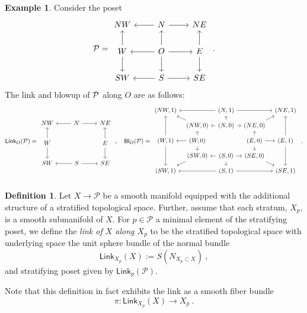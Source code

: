\documentclass{article}
\newcommand{\mc}[1]{\mathcal{#1}}
\newcommand{\msf}[1]{\mathsf{#1}}
\newcommand{\link}{\msf{Link}}
\newcommand{\bl}{\msf{Bl}}
\theoremstyle{definition}
\newtheorem{definition}[theorem]{Definition}
\newtheorem{example}[theorem]{Example}
\begin{document}
\begin{example}\label{planePoset}
    Consider the poset
    $$\cP = \begin{tikzcd}
            NW&N\arrow[r]\arrow[l]&NE\\
            W\arrow[u]\arrow[d]&O\arrow[u]\arrow[d]\arrow[r]\arrow[l]&E\arrow[u]\arrow[d]\\
            SW&S\arrow[r]\arrow[l]&SE
        \end{tikzcd}~.$$
    The link and blowup of $\mathcal P$ along $O$ are as follows:
    $$\link_O(\cP) = \begin{tikzcd}
            NW&N\arrow[r]\arrow[l]&NE\\
            W\arrow[u]\arrow[d]&&E\arrow[u]\arrow[d]\\
            SW&S\arrow[r]\arrow[l]&SE
        \end{tikzcd}~,\quad
            \bl_O(\cP) = \begin{tikzcd}[row sep= 0.7em,column sep = 0.7em]
            (NW,1)&&(N,1)\arrow[rr]\arrow[ll]&&(NE,1)\\
            &(NW,0)\arrow[ul]&(N,0)\arrow[r]\arrow[l]\arrow[u]&(NE,0)\arrow[ur]\\
            (W,1)\arrow[uu]\arrow[dd]&(W,0)\arrow[l]\arrow[u]\arrow[d]&&(E,0)\arrow[r]\arrow[u]\arrow[d]&(E,1)\arrow[uu]\arrow[dd]\\
            &(SW,0)\arrow[dl]&(S,0)\arrow[r]\arrow[l]\arrow[d]&(SE,0)\arrow[dr]\\
            (SW,1)&&(S,1)\arrow[rr]\arrow[ll]&&(SE,1)\\
        \end{tikzcd}~.$$
\end{example}

\begin{definition}
    Let $X \to \mc{P}$ be a smooth manifold equipped with the additional structure of a stratified topological
    space. Further, assume that each stratum, $X_p$, is a smooth submanifold of $X$. For $p \in \mc{P}$ a minimal element of the stratifying poset, we define the \emph{link of $X$ along $X_p$} to be the 
    stratified topological space with underlying space the unit sphere bundle of the normal bundle
    $$\link_{X_p}(X) := S(N_{X_p \subset X})~,$$
    and stratifying poset given by $\link_p(\mc{P})$. 
\end{definition}

Note that this definition in fact exhibits the link as a smooth fiber bundle
$$\pi:\link_{X_p}(X) \to X_p~.$$
\end{document}
